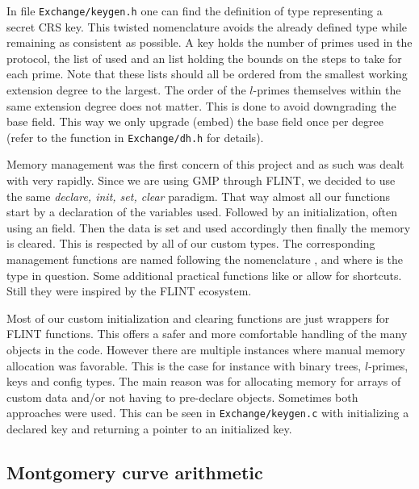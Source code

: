 \documentclass[../main.tex]{subfilesubs}
\begin{document}
In file \texttt{Exchange/keygen.h} one can find the definition of type  representing a secret CRS key.
This twisted nomenclature avoids the already defined  type while remaining as consistent as possible.
A key holds the number of primes used in the protocol, the list of  used and an  list holding the bounds on the steps to take for each prime.
Note that these lists should all be ordered from the smallest working extension degree to the largest.
The order of the $l$-primes themselves within the same extension degree does not matter.
This is done to avoid downgrading the base field.
This way we only upgrade (embed) the base field once per degree (refer to the  function  in \texttt{Exchange/dh.h} for details).

Memory management was the first concern of this project and as such was dealt with very rapidly.
Since we are using GMP through FLINT, we decided to use the same \textit{declare, init, set, clear} paradigm.
That way almost all our functions start by a declaration of the variables used.
Followed by an initialization, often using an  field.
Then the data is set and used accordingly then finally the memory is cleared.
This is respected by all of our custom types.
The corresponding management functions are named following the nomenclature ,  and  where \tF{*} is the type in question.
Some additional practical functions like  or  allow for shortcuts.
Still they were inspired by the FLINT ecosystem.

Most of our custom initialization and clearing functions are just wrappers for FLINT functions.
This offers a safer and more comfortable handling of the many objects in the code.
However there are multiple instances where manual memory allocation was favorable.
This is the case for instance with binary trees, $l$-primes, keys and config types.
The main reason was for allocating memory for arrays of custom data and/or not having to pre-declare objects.
Sometimes both approaches were used.
This can be seen in \texttt{Exchange/keygen.c} with  initializing a declared key and  returning a pointer to an initialized key.

\subsection{Montgomery curve arithmetic}
\end{document}
